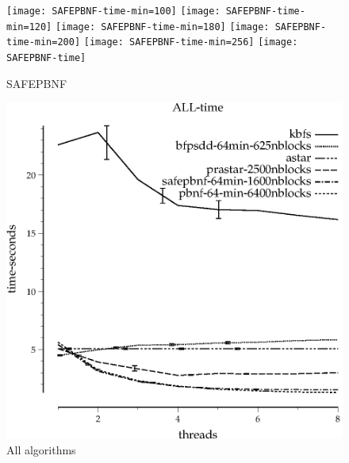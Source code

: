\documentclass{article}
\begin{document}
\begin{figure}
\begin{center}
\texttt{[image: SAFEPBNF-time-min=100]}
\texttt{[image: SAFEPBNF-time-min=120]}
\texttt{[image: SAFEPBNF-time-min=180]}
\texttt{[image: SAFEPBNF-time-min=200]}
\texttt{[image: SAFEPBNF-time-min=256]}
\texttt{[image: SAFEPBNF-time]}
\end{center}
\caption{SAFEPBNF}
\end{figure}

\begin{figure}
\begin{center}
\includegraphics{ALL-time}
\end{center}
\caption{All algorithms}
\end{figure}
\end{document}
